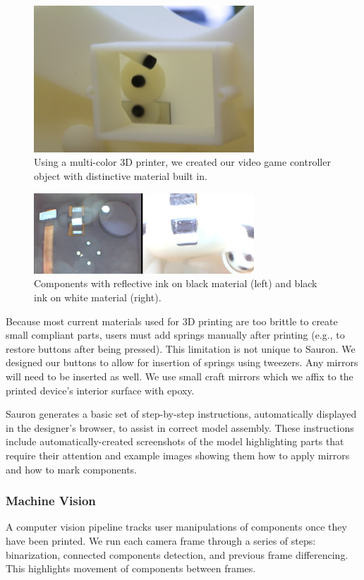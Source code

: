 \begin{figure}
\centering
\includegraphics[width=3.25in]{figures/sauron/objetback.jpg}
\caption{Using a multi-color 3D printer, we created our video game controller object with distinctive material built in.
}
\label{fig:sauron-objet}
\end{figure}

\begin{figure}
\centering
\includegraphics[width=3.25in]{figures/sauron/distinctive-materials.png}
\caption{Components with reflective ink on black material (left) and black ink on white material (right).}
\label{fig:sauron-distinctiveness}
\end{figure}

Because most current materials used for 3D printing are too brittle to create small compliant parts, users must add springs manually after printing (e.g., to restore buttons after being pressed). This limitation is not unique to Sauron. We designed our buttons to allow for insertion of springs using tweezers. Any mirrors will need to be inserted as well. We use small craft mirrors which we affix to the printed device's interior surface with epoxy.

Sauron generates a basic set of step-by-step instructions, automatically displayed in the designer's browser, to assist in correct model assembly. These instructions include automatically-created screenshots of the model highlighting parts that require their attention and example images showing them how to apply mirrors and how to mark components.%

\subsubsection{Machine Vision}
A computer vision pipeline tracks user manipulations of components once they have been printed.
We run each camera frame through a series of steps: binarization, connected components detection, and previous frame differencing. This highlights movement of components between frames.

